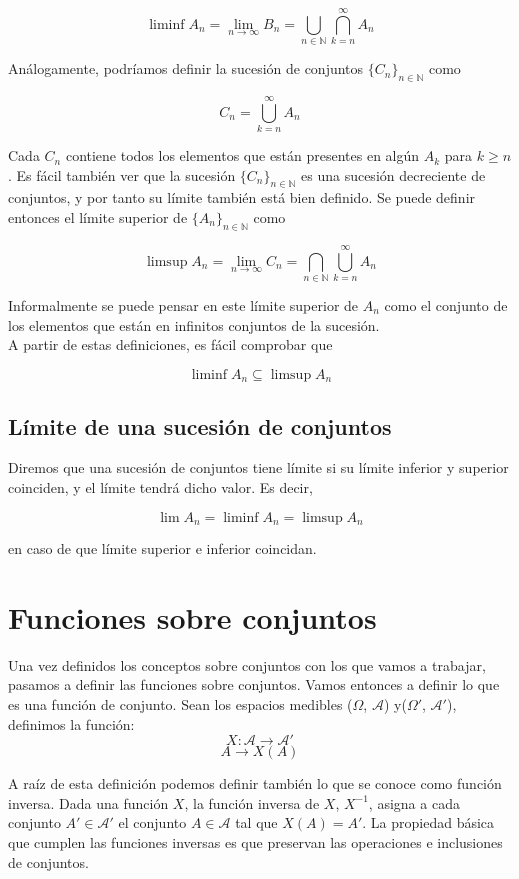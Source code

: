 $$ \liminf A_n = \lim_{n\to\infty} B_n = \bigcup_{n\in\mathbb{N}} \bigcap_{k=n}^{\infty} A_n $$

Análogamente, podríamos definir la sucesión de conjuntos $\{C_n\}_{n\in\mathbb{N}}$ como

$$ C_n = \bigcup_{k=n}^{\infty} A_n $$

Cada $C_n$ contiene todos los elementos que están presentes en algún $A_k$ para $k \geq n$. Es fácil también ver que la sucesión $\{C_n\}_{n\in\mathbb{N}}$ es una sucesión decreciente de conjuntos, y por tanto su límite también está bien definido. Se puede definir entonces el límite superior de $\{A_n\}_{n\in\mathbb{N}}$ como

$$ \limsup A_n = \lim_{n\to\infty} C_n = \bigcap_{n\in\mathbb{N}} \bigcup_{k=n}^{\infty} A_n $$

Informalmente se puede pensar en este límite superior de $A_n$ como el conjunto de los elementos que están en infinitos conjuntos de la sucesión.\\

A partir de estas definiciones, es fácil comprobar que

$$ \liminf A_n \subseteq \limsup A_n $$

\subsection{Límite de una sucesión de conjuntos}

Diremos que una sucesión de conjuntos tiene límite si su límite inferior y superior coinciden, y el límite tendrá dicho  valor. Es decir,

$$ \lim A_n = \liminf A_n = \limsup A_n $$

en caso de que límite superior e inferior coincidan.

\section{Funciones sobre conjuntos}

Una vez definidos los conceptos sobre conjuntos con los que vamos a trabajar, pasamos a definir las funciones sobre conjuntos. Vamos entonces a definir lo que es una función de conjunto. Sean los espacios medibles ($\Omega$, $\mathcal{A}$) y($\Omega'$, $\mathcal{A}'$), definimos la función:
$$ X: \mathcal{A} \to \mathcal{A}'$$
$$ A \longrightarrow X(A)$$

A raíz de esta definición podemos definir también lo que se conoce como función inversa. Dada una función $X$, la función inversa de $X$, $X^{-1}$, asigna a cada conjunto $A' \in \mathcal{A}'$ el conjunto $A \in \mathcal{A}$ tal que $X(A) = A'$. La propiedad básica que cumplen las funciones inversas es que preservan las operaciones e inclusiones de conjuntos.

